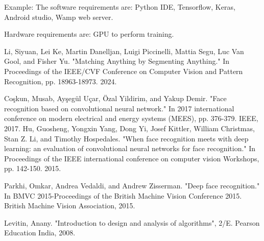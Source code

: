 \documentclass[12pt,a4paper]{report}
\begin{document}
Example: 
The software requirements are: Python IDE, Tensorflow, Keras, Android studio, Wamp web server. 

Hardware requirements are: GPU to perform training. 

\newpage
\pagestyle{plain}
\renewcommand{\bibname}{References}

\begin{thebibliography}{35}
Li, Siyuan, Lei Ke, Martin Danelljan, Luigi Piccinelli, Mattia Segu, Luc Van Gool, and Fisher Yu. "Matching Anything by Segmenting Anything." In Proceedings of the IEEE/CVF Conference on Computer Vision and Pattern Recognition, pp. 18963-18973. 2024.

Coşkun, Musab, Ayşegül Uçar, Özal Yildirim, and Yakup Demir. "Face recognition based on convolutional neural network." In 2017 international conference on modern electrical and energy systems (MEES), pp. 376-379. IEEE, 2017.
Hu, Guosheng, Yongxin Yang, Dong Yi, Josef Kittler, William Christmas, Stan Z. Li, and Timothy Hospedales. "When face recognition meets with deep learning: an evaluation of convolutional neural networks for face recognition." In Proceedings of the IEEE international conference on computer vision Workshops, pp. 142-150. 2015.

Parkhi, Omkar, Andrea Vedaldi, and Andrew Zisserman. "Deep face recognition." In BMVC 2015-Proceedings of the British Machine Vision Conference 2015. British Machine Vision Association, 2015.

Levitin, Anany. "Introduction to design and analysis of algorithms", 2/E. Pearson Education India, 2008.


\end{thebibliography}
\end{document}
